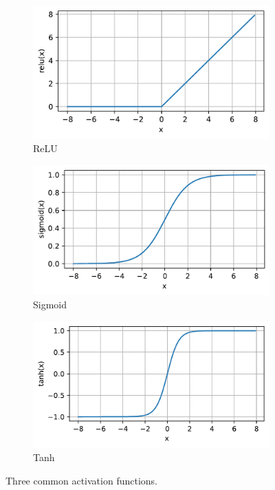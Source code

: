 \begin{figure}[t]
     \centering
     \captionsetup{justification=centering}
     \begin{subfigure}[b]{0.3\textwidth}
         \centering
         \includegraphics[width=\textwidth]{chapters/assets/relu.pdf}
         \caption{ReLU}
         \label{fig:relu}
     \end{subfigure}
     \hfill
     \begin{subfigure}[b]{0.3\textwidth}
         \centering
         \includegraphics[width=\textwidth]{chapters/assets/sigmoid.pdf}
         \caption{Sigmoid}
         \label{fig:sigmoid}
     \end{subfigure}
     \hfill
     \begin{subfigure}[b]{0.3\textwidth}
         \centering
         \includegraphics[width=\textwidth]{chapters/assets/tanh.pdf}
         \caption{Tanh}
         \label{fig:tanh}
     \end{subfigure}
        \caption{Three common activation functions.}
        \label{fig:three-activation-funcs}
\end{figure}


